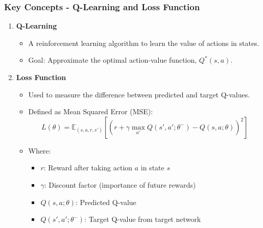 \documentclass{beamer}
\begin{document}
\begin{frame}[fragile]
    \frametitle{Key Concepts - Q-Learning and Loss Function}
    \begin{enumerate}
        \item \textbf{Q-Learning}
        \begin{itemize}
            \item A reinforcement learning algorithm to learn the value of actions in states.
            \item Goal: Approximate the optimal action-value function, \(Q^*(s, a)\).
        \end{itemize}
        
        \item \textbf{Loss Function}
        \begin{itemize}
            \item Used to measure the difference between predicted and target Q-values.
            \item Defined as Mean Squared Error (MSE):
            \begin{equation}
                L(\theta) = \mathbb{E}_{(s, a, r, s')}\left[(r + \gamma \max_{a'}Q(s', a'; \theta^-) - Q(s, a; \theta))^2\right]
            \end{equation}
            \item Where:
            \begin{itemize}
                \item \( r \): Reward after taking action \( a \) in state \( s \)
                \item \( \gamma \): Discount factor (importance of future rewards)
                \item \( Q(s, a; \theta) \): Predicted Q-value
                \item \( Q(s', a'; \theta^-) \): Target Q-value from target network
            \end{itemize}
        \end{itemize}
    \end{enumerate}
\end{frame}
\end{document}
